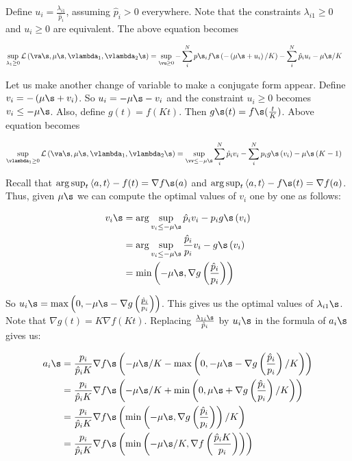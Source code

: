 \documentclass[twoside]{article}
\begin{document}
Define $u_{i}=\frac{\lambda_{i1}}{\hat{p}_{i}}$, assuming $\hat{p}_{i}>0$
everywhere. Note that the constraints $\lambda_{i1}\ge0$ and $u_{i}\ge0$
are equivalent. The above equation becomes

\begin{align}
\sup_{\lambda_1\ge0}\mathcal{L}\left(\va\s,\mu\s, \vlambda_{1},\vlambda_{2}\s\right) & =\sup_{\vu\ge0}-\sum_{i}^{N}p\s_{i}f\s\left(-\left(\mu\s+u_{i}\right)/K\right)-\sum_{i}^{N}\hat{p}_{i}u_{i}-\mu\s/K
\end{align}

Let us make another change of variable to make a conjugate form appear.
Define $v_{i}=-\left(\mu\s+v_{i}\right)$. So $u_{i}=-\mu\s-v_{i}$
and the constraint $u_{i}\ge0$ becomes $v_{i}\le-\mu\s$.
Also, define $g(t)=f(Kt)$. Then $g\s  (t)=f\s(\frac{t}{K})$.
Above equation becomes 

\begin{align}
	\sup_{\vlambda_1\ge0}\mathcal{L}\left(\va\s,\mu\s, \vlambda_{1},\vlambda_{2}\s\right) & =\sup_{\vv\le-\mu\s}\sum_{i}^{N}\hat{p}_{i}v_{i}-\sum_{i}^{N}p_i g\s  \left(v_{i}\right)-\mu\s\left(K-1\right)
\end{align}

Recall that $\arg\sup_{t}\left\langle a,t\right\rangle -f(t)=\nabla f\s(a)$
and $\arg\sup_{t}\left\langle a,t\right\rangle -f\s(t)=\nabla f(a)$.
Thus, given $\mu\s$ we can compute the optimal values of $v_{i}$
one by one as follows:

\begin{align*}
v_{i}\s & =\arg\sup_{v_{i}\le-\mu\s}\hat{p}_{i}v_{i}-p_i g\s  \left(v_{i}\right)\\
 & =\arg\sup_{v_{i}\le-\mu\s}\frac{\hat{p}_{i}}{p_i}v_{i}-g\s  \left(v_{i}\right)\\
 & =\min\left(-\mu\s,\nabla g\left(\frac{\hat{p}_{i}}{p_i}\right)\right)
\end{align*}

So $u_{i}\s=\max\left(0,-\mu\s-\nabla g\left(\frac{\hat{p}_{i}}{p_i}\right)\right)$. This gives us the optimal values of $\lambda_{i1}\s$.
Note that $\nabla g(t)=K\nabla f\left(Kt\right)$. Replacing $\frac{\lambda_{1i}\s}{\hat{p}_{i}}$ by $u_{i}\s$
in the formula of $a_{i}\s$ gives us:

\begin{align*}
a_{i}\s & =\frac{p_i }{\hat{p}_{i}K}\nabla f\s\left(-\mu\s/K-\max\left(0,-\mu\s-\nabla g\left(\frac{\hat{p}_{i}}{p_i}\right)/K\right)\right)\\
 & =\frac{p_i }{\hat{p}_{i}K}\nabla f\s\left(-\mu\s/K+\min\left(0,\mu\s+\nabla g\left(\frac{\hat{p}_{i}}{p_i}\right)/K\right)\right)\\
 & =\frac{p_i }{\hat{p}_{i}K}\nabla f\s\left(\min\left(-\mu\s,\nabla g\left(\frac{\hat{p}_{i}}{p_i}\right)\right)/K\right)\\
 & =\frac{p_i }{\hat{p}_{i}K}\nabla f\s\left(\min\left(-\mu\s/K,\nabla f\left(\frac{\hat{p}_{i}K}{p_i}\right)\right)\right)
\end{align*}
\end{document}
